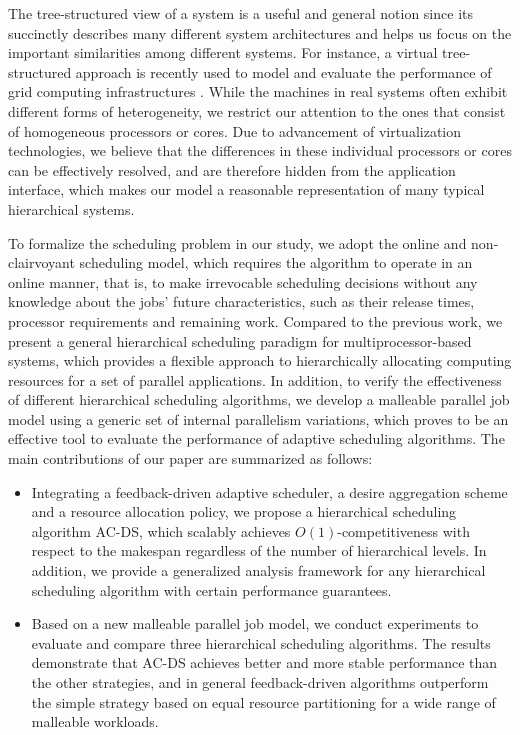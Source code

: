 \documentclass[10pt, a4paper]{article}
\begin{document}
The tree-structured view of a system is a useful and general notion since its succinctly describes
many different system architectures and helps us focus on the important similarities among
different systems. For instance, a virtual tree-structured approach is recently used to model and
evaluate the performance of grid computing infrastructures \cite{DaiLeTr07,LiLi09,HanKiJu09}. While
the machines in real systems often exhibit different forms of heterogeneity, we restrict our
attention to the ones that consist of homogeneous processors or cores. Due to advancement of
virtualization technologies, we believe that the differences in these individual processors or
cores can be effectively resolved, and are therefore hidden from the application interface, which
makes our model a reasonable representation of many typical hierarchical systems.

To formalize the scheduling problem in our study, we adopt the online and non-clairvoyant
scheduling model, which requires the algorithm to operate in an online manner, that is, to make
irrevocable scheduling decisions without any knowledge about the jobs' future characteristics, such
as their release times, processor requirements and remaining work. Compared to the previous work,
we present a general hierarchical scheduling paradigm for multiprocessor-based systems, which
provides a flexible approach to hierarchically allocating computing resources for a set of parallel
applications. In addition, to verify the effectiveness of different hierarchical scheduling
algorithms, we develop a malleable parallel job model using a generic set of internal parallelism
variations, which proves to be an effective tool to evaluate the performance of adaptive scheduling
algorithms. The main contributions of our paper are summarized as follows:
 \begin{itemize}
\item Integrating a feedback-driven adaptive scheduler, a desire aggregation scheme and a resource allocation policy, we propose a hierarchical scheduling algorithm AC-DS, which scalably achieves $O(1)$-competitiveness with respect to the makespan regardless of the number of hierarchical levels. In addition, we provide a generalized analysis framework for any hierarchical scheduling algorithm with certain performance guarantees.
\item Based on a new malleable parallel job model, we conduct experiments to evaluate and compare three hierarchical scheduling algorithms. The results demonstrate that AC-DS achieves better and more stable performance than the other strategies, and in general feedback-driven algorithms outperform the simple strategy based on equal resource partitioning for a wide range of malleable workloads.
 \end{itemize}
\end{document}
